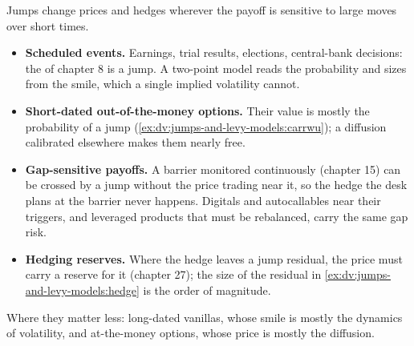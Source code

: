 Jumps change prices and hedges wherever the payoff is sensitive to large moves over short times.
\begin{itemize}
\item \textbf{Scheduled events.} Earnings, trial results, elections, central-bank decisions: the 
of chapter 8 is a jump. A two-point model reads the probability and sizes from the smile, which a single implied
volatility cannot.
\item \textbf{Short-dated out-of-the-money options.} Their value is mostly the probability of a jump
(\cref{ex:dv:jumps-and-levy-models:carrwu}); a diffusion calibrated elsewhere makes them nearly free.
\item \textbf{Gap-sensitive payoffs.} A barrier monitored continuously (chapter 15) can be crossed by a jump
without the price trading near it, so the hedge the desk plans at the barrier never happens. Digitals and
autocallables near their triggers, and leveraged products that must be rebalanced, carry the same gap risk.
\item \textbf{Hedging reserves.} Where the hedge leaves a jump residual, the price must carry a reserve for it
(chapter 27); the size of the residual in \cref{ex:dv:jumps-and-levy-models:hedge} is the order of magnitude.
\end{itemize}
Where they matter less: long-dated vanillas, whose smile is mostly the dynamics of volatility, and at-the-money
options, whose price is mostly the diffusion.

